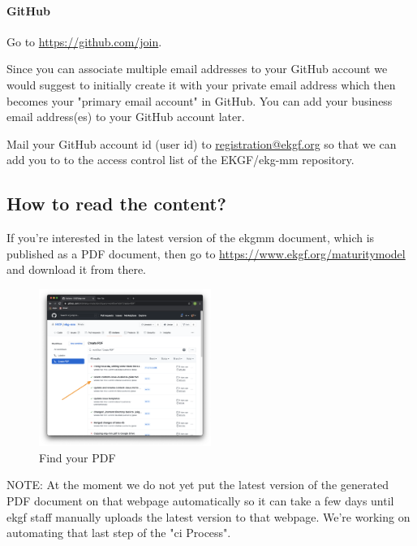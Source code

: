 \paragraph{GitHub}

Go to \url{https://github.com/join}.

Since you can associate multiple email addresses to your GitHub account we would
suggest to initially create it with your private email address which then becomes
your "primary email account" in GitHub.
You can add your business email address(es) to your GitHub account later.

Mail your GitHub account id (user id) to
\href{mailto:registration@ekgf.org}{registration@ekgf.org} so that we can add you
to to the access control list of the EKGF/ekg-mm repository.

\pagebreak
\subsection{How to read the content?}

If you’re interested in the latest version of the \gls{ekgmm} document,
which is published as a PDF document, then go to
\url{https://www.ekgf.org/maturitymodel} and download it from there.

\begin{figure}
    \vspace{-12pt}
    \begin{center}
        \includegraphics[width=0.50\textwidth]{../images/ekgmm-process-create-pdf-workflow.png}
    \end{center}
    \caption{Find your PDF}
    \label{fig:ekgmm-process-find-your-pdf}
\end{figure}

NOTE: At the moment we do not yet put the latest version of the generated 
PDF document on that webpage automatically so it can take a few days until 
\gls{ekgf} staff manually uploads the latest version to that webpage. 
We’re working on automating that last step of the "\gls{ci} Process".

